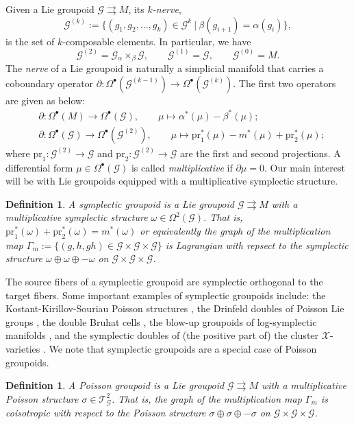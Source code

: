 \documentclass{amsart}
\newtheorem{definition}[theorem]{Definition}
\numberwithin{equation}{section}
\newcommand{\cG}{\mathcal{G}}
\newcommand{\cT}{\mathcal{T}}
\newcommand{\cX}{\mathcal{X}}
\newcommand{\rra}{\rightrightarrows}
\begin{document}
Given a Lie groupoid $\cG \rra M$, its \emph{$k$-nerve},
\[\cG^{(k)} := \{(g_1, g_2, \ldots, g_k) \in \cG^k ~|~ \beta(g_{i+1}) = \alpha(g_i)\},\]
is the set of $k$-composable elements.
In particular, we have
\[\cG^{(2)} = \cG {_\alpha \times_\beta} \cG,\qquad \cG^{(1)} = \cG,\qquad \cG^{(0)} = M.\]
The \emph{nerve} of a Lie groupoid is naturally a simplicial manifold that carries a coboundary operator $\partial: \Omega^\bullet(\cG^{(k-1)}) \to \Omega^\bullet(\cG^{(k)})$.
The first two operators are given as below:
\begin{align} 
  \label{eq:gpdcob}
  & \partial: \Omega^\bullet(M) \to \Omega^\bullet(\cG), \qquad \mu \mapsto \alpha^*(\mu) - \beta^*(\mu); \\
  & \partial: \Omega^\bullet(\cG) \to \Omega^\bullet(\cG^{(2)}), \qquad \mu \mapsto \mathrm{pr}_1^*(\mu) - m^*(\mu) + \mathrm{pr}_2^*(\mu);
\end{align}
where $\mathrm{pr}_1: \cG^{(2)} \to \cG$ and $\mathrm{pr}_2: \cG^{(2)} \to \cG$ are the first and second projections.
A differential form $\mu \in \Omega^\bullet(\cG)$ is called \emph{multiplicative} if $\partial \mu = 0$.
Our main interest will be with Lie groupoids equipped with a multiplicative symplectic structure.
\begin{definition}
  A \emph{symplectic groupoid} is a Lie groupoid $\cG \rra M$ with a multiplicative symplectic structure $\omega \in \Omega^2(\cG)$.
  That is, $\mathrm{pr}_1^*(\omega)+\mathrm{pr}_2^*(\omega) = m^*(\omega)$ or equivalently the graph of the multiplication map $\Gamma_m := \{(g, h, gh) \in \cG \times \cG \times \cG\}$ is Lagrangian with repsect to the symplectic structure $\omega \oplus \omega \oplus -\omega$ on $\cG\times\cG\times\cG$.
\end{definition}

The source fibers of a symplectic groupoid are symplectic orthogonal to the target fibers.
Some important examples of symplectic groupoids include: the Kostant-Kirillov-Souriau Poisson structures \cite{CDW87}, the Drinfeld doubles of Poisson Lie groups \cite{LW89}, the double Bruhat cells \cite{LuM16}, the blow-up groupoids of log-symplectic manifolds \cite{GL14}, and the symplectic doubles of (the positive part of) the cluster $\cX$-varieties \cite{FG09c}.
We note that symplectic groupoids are a special case of Poisson groupoids.
\begin{definition}
  A \emph{Poisson groupoid} is a Lie groupoid $\cG \rra M$ with a multiplicative Poisson structure $\sigma \in \cT^2_\cG$.
  That is, the graph of the multiplication map $\Gamma_m$ is coisotropic with respect to the Poisson structure $\sigma \oplus \sigma \oplus -\sigma$ on $\cG\times\cG\times\cG$.
\end{definition}
\end{document}
